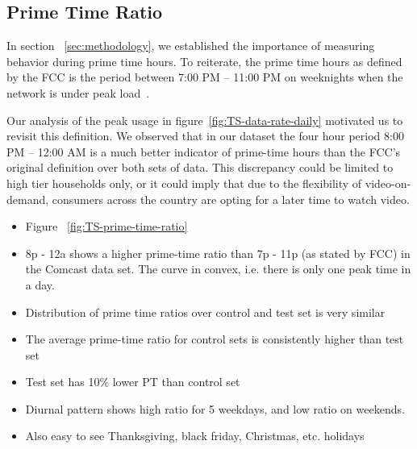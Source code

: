 \subsection{Prime Time Ratio}
\label{subsec:prime-time}


In section ~\ref{sec:methodology}, we established the importance of measuring behavior during prime time hours. To reiterate, the prime time hours as defined by the FCC is the period between 7:00 PM -- 11:00 PM on weeknights when the network is under peak load~\cite{fcc2014measuring-broadband}. 

Our analysis of the peak usage in figure~\ref{fig:TS-data-rate-daily} motivated us to revisit this definition. We observed that in our dataset the four hour period 8:00 PM -- 12:00 AM is a much better indicator of prime-time hours than the FCC's original definition over both sets of data. This discrepancy could be limited to high tier households only, or it could imply that due to the flexibility of video-on-demand, consumers across the country are opting for a later time to watch video.

\begin{itemize}
\itemsep0em 
\item Figure ~\ref{fig:TS-prime-time-ratio}
\item 8p - 12a shows a higher prime-time ratio than 7p - 11p (as stated by FCC) in the Comcast data set. The curve in convex, i.e. there is only one peak time in a day.
\item Distribution of prime time ratios over control and test set is very similar
\item The average prime-time ratio for control sets is consistently higher than test set
\item Test set has 10\% lower PT than control set
\item Diurnal pattern shows high ratio for 5 weekdays, and low ratio on weekends.
\item Also easy to see Thanksgiving, black friday, Christmas, etc. holidays
\end{itemize}



